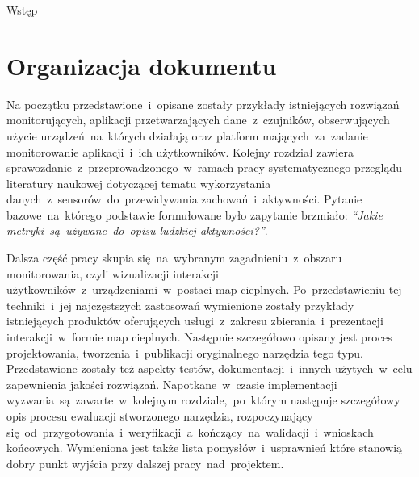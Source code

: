 \begin{chapter}{Wstęp}
	\section{Organizacja dokumentu}
	Na początku przedstawione~i~opisane zostały przykłady istniejących rozwiązań monitorujących, aplikacji przetwarzających dane~z~czujników, obserwujących użycie urządzeń~na~których działają oraz platform mających~za~zadanie monitorowanie aplikacji~i~ich użytkowników. Kolejny rozdział zawiera sprawozdanie~z~przeprowadzonego~w~ramach pracy systematycznego przeglądu literatury naukowej dotyczącej tematu wykorzystania danych~z~sensorów~do~przewidywania zachowań~i~aktywności. Pytanie bazowe~na~którego podstawie formułowane było zapytanie brzmiało: {\it ``Jakie metryki~są~używane~do~opisu ludzkiej aktywności?''}. 
	
	Dalsza część pracy skupia się~na~wybranym zagadnieniu~z~obszaru monitorowania, czyli wizualizacji interakcji użytkowników~z~urządzeniami~w~postaci map cieplnych. Po~przedstawieniu tej techniki~i~jej najczęstszych zastosowań wymienione zostały przykłady istniejących produktów oferujących usługi~z~zakresu zbierania~i~prezentacji interakcji~w~formie map cieplnych. Następnie szczegółowo opisany jest proces projektowania, tworzenia~i~publikacji oryginalnego narzędzia tego typu. Przedstawione zostały też aspekty testów, dokumentacji~i~innych użytych~w~celu zapewnienia jakości rozwiązań. Napotkane~w~czasie implementacji wyzwania~są~zawarte~w~kolejnym rozdziale,~po~którym następuje szczegółowy opis procesu ewaluacji stworzonego narzędzia, rozpoczynający się~od~przygotowania~i~weryfikacji~a~kończący~na~walidacji~i~wnioskach końcowych. Wymieniona jest także lista pomysłów~i~usprawnień które stanowią dobry punkt wyjścia przy dalszej pracy~nad~projektem.
\end{chapter}
